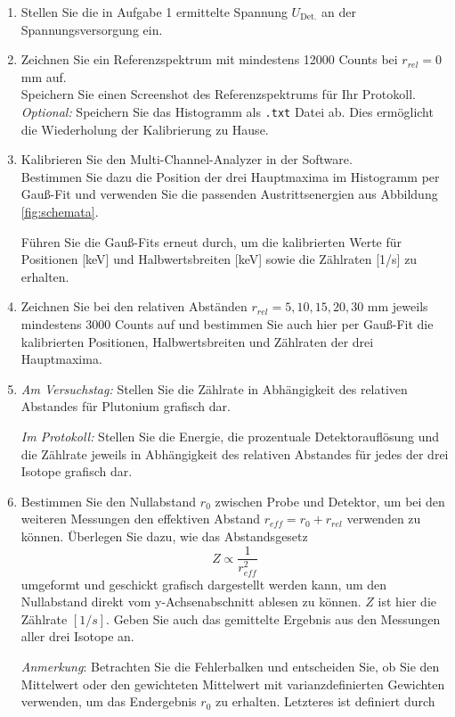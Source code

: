 \begin{enumerate}[label=\textbf{\alph*)}]
	\item Stellen Sie die in Aufgabe 1 ermittelte Spannung $U_{\text{Det.}}$ an der Spannungsversorgung ein.
	\item Zeichnen Sie ein Referenzspektrum mit mindestens 12000 Counts bei $r_{rel} = 0$ mm auf.
		\\ Speichern Sie einen Screenshot des Referenzspektrums für Ihr Protokoll.
		\\ \textit{Optional:} Speichern Sie das Histogramm als \verb|.txt| Datei ab. Dies ermöglicht die Wiederholung der Kalibrierung zu Hause. 
	\item Kalibrieren Sie den Multi-Channel-Analyzer in der Software. \\Bestimmen Sie dazu die Position der drei Hauptmaxima im Histogramm per Gauß-Fit und verwenden Sie die passenden Austrittsenergien aus Abbildung \ref{fig:schemata}.
	
	Führen Sie die Gauß-Fits erneut durch, um die kalibrierten Werte für Positionen [keV] und Halbwertsbreiten [keV] sowie die Zählraten [1/s] zu erhalten.
	\item Zeichnen Sie bei den relativen Abständen $r_{rel} = 5, 10, 15, 20, 30$ mm jeweils mindestens 3000 Counts auf und bestimmen Sie auch hier per Gauß-Fit die kalibrierten Positionen, Halbwertsbreiten und Zählraten der drei Hauptmaxima.
	\item \textit{Am Versuchstag:} Stellen Sie die Zählrate in Abhängigkeit des relativen Abstandes für Plutonium grafisch dar.
	
	\textit{Im Protokoll:} Stellen Sie die Energie, die prozentuale Detektorauflösung und die Zählrate  jeweils in Abhängigkeit des relativen Abstandes für jedes der drei Isotope grafisch dar.
	\item Bestimmen Sie den Nullabstand $r_0$ zwischen Probe und Detektor, um bei den weiteren Messungen den effektiven Abstand $r_{eff} = r_0 + r_{rel}$ verwenden zu können. Überlegen Sie dazu, wie das Abstandsgesetz
	\begin{equation}
		Z \propto \frac{1}{r^2_{eff}}
	\end{equation}
	umgeformt und geschickt grafisch dargestellt werden kann, um den Nullabstand direkt vom y-Achsenabschnitt ablesen zu können. $Z$ ist hier die Zählrate $[1/s]$. Geben Sie auch das gemittelte Ergebnis aus den Messungen aller drei Isotope an.

    \textit{Anmerkung}: Betrachten Sie die Fehlerbalken und entscheiden Sie, ob Sie den Mittelwert oder den gewichteten Mittelwert mit varianzdefinierten Gewichten verwenden, um das Endergebnis $r_0$ zu erhalten. Letzteres ist definiert durch 


\end{enumerate}
